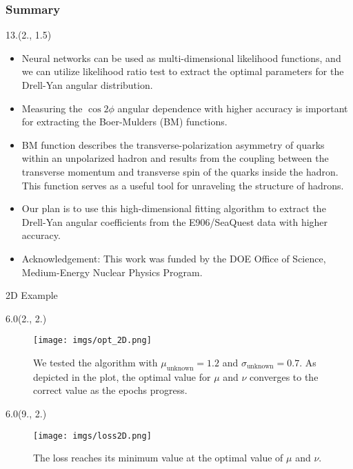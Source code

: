 \documentclass[12pt, xcolor={dvipsnames}, aspectratio = 169, sans,mathserif]{beamer}
\newenvironment{List}[2]
{\begin{textblock}{#1}#2
\begin{itemize}}
{\end{itemize}
\end{textblock}}
\newenvironment{Pic}[2]
{\begin{textblock}{#1}#2
\begin{figure}}
{\end{figure}
\end{textblock}}
\begin{document}
\begin{frame}
\frametitle{Summary}

\begin{List}{13.}{(2., 1.5)}

  \item Neural networks can be used as multi-dimensional likelihood functions, and we can utilize likelihood ratio test
  to extract the optimal parameters for the Drell-Yan angular distribution.

  \item Measuring the $\cos2\phi$ angular dependence with higher accuracy is important for extracting the Boer-Mulders
  (BM) functions.

  \item BM function describes the transverse-polarization asymmetry of quarks within an unpolarized hadron and results
  from the coupling between the transverse momentum and transverse spin of the quarks inside the hadron. This function
  serves as a useful tool for unraveling the structure of hadrons.

  \item Our plan is to use this high-dimensional fitting algorithm to extract the Drell-Yan angular coefficients from the
  E906/SeaQuest data with higher accuracy.

  \item Acknowledgement: This work was funded by the DOE Office of Science, Medium-Energy Nuclear Physics Program.

\end{List}

\end{frame}

\begin{frame}{2D Example}

\begin{Pic}{6.0}{(2., 2.)}
\texttt{[image: imgs/opt\_2D.png]}
\caption{We tested the algorithm with $\mu_{\text{unknown}} = 1.2$ and $\sigma_{\text{unknown}} = 0.7$. As depicted in the plot, the optimal value for $\mu$
and $\nu$ converges to the correct value as the epochs progress.}
\end{Pic}

\begin{Pic}{6.0}{(9., 2.)}
\texttt{[image: imgs/loss2D.png]}
\caption{The loss reaches its minimum value at the optimal value of $\mu$ and $\nu$.}
\end{Pic}

\end{frame}
\end{document}
